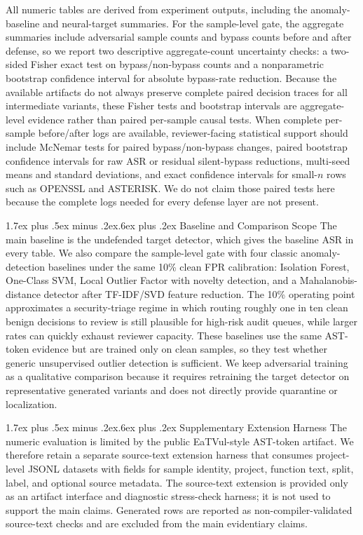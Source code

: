 \documentclass[letterpaper,twocolumn,10pt,twoside]{article}
\makeatletter
\renewcommand\subsection{\@startsection{subsection}{2}{\z@}%
  {1.7ex plus .5ex minus .2ex}{.6ex plus .2ex}%
  {\normalfont\normalsize\bfseries}}
\newcommand{\gate}{sample-level gate}
\newcommand{\asrshort}{ASR}
\newcommand{\dataset}[1]{\textsc{#1}}
\makeatother
\begin{document}
All numeric tables are derived from experiment outputs, including the anomaly-baseline and neural-target summaries. For the sample-level gate, the aggregate summaries include adversarial sample counts and bypass counts before and after defense, so we report two descriptive aggregate-count uncertainty checks: a two-sided Fisher exact test on bypass/non-bypass counts and a nonparametric bootstrap confidence interval for absolute bypass-rate reduction. Because the available artifacts do not always preserve complete paired decision traces for all intermediate variants, these Fisher tests and bootstrap intervals are aggregate-level evidence rather than paired per-sample causal tests. When complete per-sample before/after logs are available, reviewer-facing statistical support should include McNemar tests for paired bypass/non-bypass changes, paired bootstrap confidence intervals for raw \asrshort{} or residual silent-bypass reductions, multi-seed means and standard deviations, and exact confidence intervals for small-$n$ rows such as \dataset{OPENSSL} and \dataset{ASTERISK}. We do not claim those paired tests here because the complete logs needed for every defense layer are not present.

\subsection{Baseline and Comparison Scope}
The main baseline is the undefended target detector, which gives the baseline \asrshort{} in every table. We also compare the \gate{} with four classic anomaly-detection baselines under the same 10\% clean FPR calibration: Isolation Forest, One-Class SVM, Local Outlier Factor with novelty detection, and a Mahalanobis-distance detector after TF-IDF/SVD feature reduction. The 10\% operating point approximates a security-triage regime in which routing roughly one in ten clean benign decisions to review is still plausible for high-risk audit queues, while larger rates can quickly exhaust reviewer capacity. These baselines use the same AST-token evidence but are trained only on clean samples, so they test whether generic unsupervised outlier detection is sufficient. We keep adversarial training as a qualitative comparison because it requires retraining the target detector on representative generated variants and does not directly provide quarantine or localization.

\subsection{Supplementary Extension Harness}
The numeric evaluation is limited by the public EaTVul-style AST-token artifact. We therefore retain a separate source-text extension harness that consumes project-level JSONL datasets with fields for sample identity, project, function text, split, label, and optional source metadata. The source-text extension is provided only as an artifact interface and diagnostic stress-check harness; it is not used to support the main claims. Generated rows are reported as non-compiler-validated source-text checks and are excluded from the main evidentiary claims.
\end{document}
